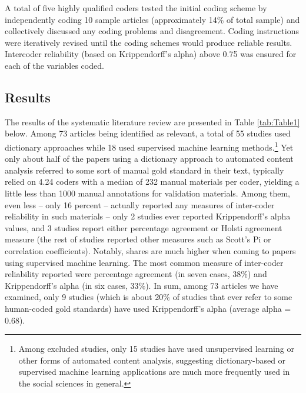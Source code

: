 \documentclass[man, 12pt, a4paper, nolmodern, noextraspace]{apa6}
\begin{document}
    A total of five highly qualified coders tested the initial coding scheme by independently coding 10 sample articles (approximately 14\% of total sample) and collectively discussed any coding problems and disagreement. Coding instructions were iteratively revised until the coding schemes would produce reliable results. Intercoder reliability (based on Krippendorff’s alpha) above 0.75 was ensured for each of the variables coded.   
    
\subsection{Results}

    The results of the systematic literature review are presented in Table \ref{tab:Table1} below. Among 73 articles being identified as relevant, a total of 55 studies used dictionary approaches while 18 used supervised machine learning methods.\footnote{ Among excluded studies, only 15 studies have used unsupervised learning or other forms of automated content analysis, suggesting dictionary-based or supervised machine learning applications are much more frequently used in the social sciences in general.\label{fn:Study1}} Yet only about half of the papers using a dictionary approach to automated content analysis referred to some sort of manual gold standard in their text, typically relied on 4.24 coders with a median of 232 manual materials per coder, yielding a little less than 1000 manual annotations for validation materials. Among them, even less – only 16 percent – actually reported any measures of inter-coder reliability in such materials -- only 2 studies ever reported Krippendorff’s alpha values, and 3 studies report either percentage agreement or Holsti agreement measure (the rest of studies reported other measures such as Scott's Pi or correlation coefficients). Notably, shares are much higher when coming to papers using supervised machine learning. The most common measure of inter-coder reliability reported were percentage agreement (in seven cases, 38\%) and Krippendorff’s alpha (in six cases, 33\%). In sum, among 73 articles we have examined, only 9 studies (which is about 20\% of studies that ever refer to some human-coded gold standards) have used Krippendorff’s alpha (average alpha = 0.68). 
    
\end{document}
